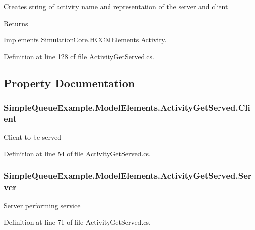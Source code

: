 Creates string of activity name and representation of the server and client 

\begin{DoxyReturn}{Returns}

\end{DoxyReturn}


Implements \hyperlink{class_simulation_core_1_1_h_c_c_m_elements_1_1_activity_a352124cf18f8505e51c8847a71769f7d}{Simulation\+Core.\+H\+C\+C\+M\+Elements.\+Activity}.



Definition at line 128 of file Activity\+Get\+Served.\+cs.



\subsection{Property Documentation}
\subsubsection[{\texorpdfstring{Client}{Client}}]{ Simple\+Queue\+Example.\+Model\+Elements.\+Activity\+Get\+Served.\+Client\hspace{0.3cm}{\ttfamily [get]}}\hypertarget{class_simple_queue_example_1_1_model_elements_1_1_activity_get_served_a24f6451b1cb6c05770a97b8acdcc6550}{}\label{class_simple_queue_example_1_1_model_elements_1_1_activity_get_served_a24f6451b1cb6c05770a97b8acdcc6550}


Client to be served 



Definition at line 54 of file Activity\+Get\+Served.\+cs.

\subsubsection[{\texorpdfstring{Server}{Server}}]{ Simple\+Queue\+Example.\+Model\+Elements.\+Activity\+Get\+Served.\+Server\hspace{0.3cm}{\ttfamily [get]}}\hypertarget{class_simple_queue_example_1_1_model_elements_1_1_activity_get_served_a24fd2ccb9ebadb070597b64d58c0dc48}{}\label{class_simple_queue_example_1_1_model_elements_1_1_activity_get_served_a24fd2ccb9ebadb070597b64d58c0dc48}


Server performing service 



Definition at line 71 of file Activity\+Get\+Served.\+cs.

